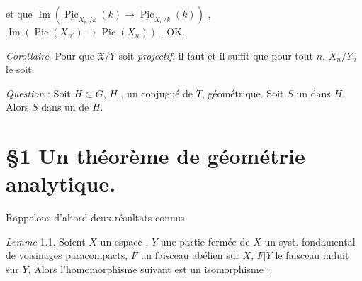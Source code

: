 \documentclass[11pt,a4paper]{article}
\begin{document}
et \ill{}  \ill{}  que
$\operatorname{Im}(\underline{\operatorname{Pic}}_{X_{n'}/k}(k) \to \underline{\operatorname{Pic}}_{X_n/k}(k))$
 , 
$\operatorname{Im}(\operatorname{Pic}(X_{n'}) \to \operatorname{Pic}(X_n))$
 . OK.



\emph{Corollaire}. Pour que $\mathfrak{X}/Y$ soit \emph{projectif}, il faut et il suffit que pour tout $n$, $X_n/Y_n$ le soit.

\emph{Question} : Soit $H \subset G$, $H$  \ill{},  un \struck{\ill{}} conjugué de $T$,  géométrique. Soit $S$ un  dans $H$. Alors $S$   dans un   \ill{} de $H$.

\section{§1 Un théorème de géométrie analytique.}

Rappelons d'abord deux résultats connus.

\emph{Lemme} 1.1. Soient $X$ un espace  \ill{}, $Y$ une partie fermée de $X$  un syst. fondamental de voisinages paracompacts, $F$ un faisceau abélien sur $X$, $F|Y$ le faisceau induit sur $Y$. Alors l'homomorphisme  \struck{\ill{}} suivant est un isomorphisme :
\end{document}
